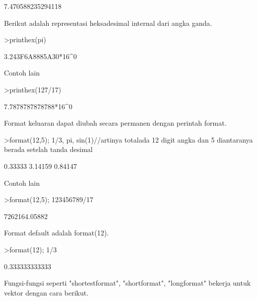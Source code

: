\documentclass[12pt,arial,letterpaper]{book}
\begin{document}
\begin{euleroutput}
        7.470588235294118 
\end{euleroutput}
\begin{eulercomment}
Berikut adalah representasi heksadesimal internal dari angka ganda.
\end{eulercomment}
\begin{eulerprompt}
>printhex(pi)
\end{eulerprompt}
\begin{euleroutput}
  3.243F6A8885A30*16^0
\end{euleroutput}
\begin{eulercomment}
Contoh lain
\end{eulercomment}
\begin{eulerprompt}
>printhex(127/17)
\end{eulerprompt}
\begin{euleroutput}
  7.7878787878788*16^0
\end{euleroutput}
\begin{eulercomment}
Format keluaran dapat diubah secara permanen dengan perintah format.
\end{eulercomment}
\begin{eulerprompt}
>format(12,5); 1/3, pi, sin(1)//artinya totalada 12 digit angka dan 5 diantaranya berada setelah tanda desimal
\end{eulerprompt}
\begin{euleroutput}
      0.33333 
      3.14159 
      0.84147 
\end{euleroutput}
\begin{eulercomment}
Contoh lain
\end{eulercomment}
\begin{eulerprompt}
>format(12,5); 123456789/17
\end{eulerprompt}
\begin{euleroutput}
  7262164.05882 
\end{euleroutput}
\begin{eulercomment}
Format default adalah format(12).
\end{eulercomment}
\begin{eulerprompt}
>format(12); 1/3
\end{eulerprompt}
\begin{euleroutput}
  0.333333333333
\end{euleroutput}
\begin{eulercomment}
Fungsi-fungsi seperti "shortestformat", "shortformat", "longformat"
bekerja untuk vektor dengan cara berikut.
\end{eulercomment}
\end{document}
